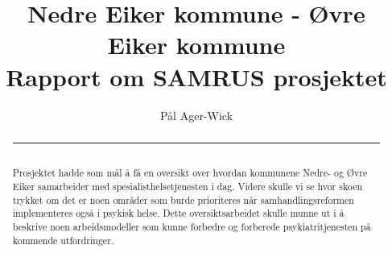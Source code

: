 \documentclass[11pt]{report} %
\title{Nedre Eiker kommune - Øvre Eiker kommune \\ Rapport om SAMRUS prosjektet}
\author{Pål Ager-Wick}
\begin{document}
\pagecolor{f_page}\afterpage{\nopagecolor}
\maketitle



              \renewcommand{\abstractname}{Oppsummering}

              \begin{abstract}
              \rule{\textwidth}{1pt}\\%
              Prosjektet hadde som mål å få en oversikt over hvordan kommunene Nedre- og Øvre Eiker samarbeider med spesialisthelsetjenesten i dag. Videre skulle vi se hvor skoen trykket om det er noen områder som burde prioriteres når samhandlingsreformen implementeres også i psykisk helse. Dette oversiktsarbeidet skulle munne ut i å beskrive noen arbeidsmodeller som kunne forbedre og forberede psykiatritjenesten på kommende utfordringer. 


\end{abstract}
\end{document}

